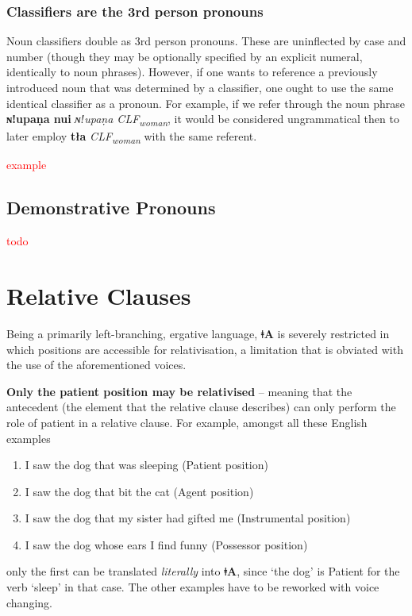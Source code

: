 \documentclass[11pt,a5paper]{book}
\newcommand{\qcn}[1]{\textcolor{AccentText}{\large\textbf{#1}}}
\newcommand{\langname}{\qcn{ǂA}}
\newcommand{\transl}[2]{\qcn{#1} \emph{#2}}
\newcommand{\grammsc}[1]{\textsc{#1}}
\newcommand{\CLF}[1]{\grammsc{CLF}\textsubscript{#1}}
\newcommand{\cmnt}[1]{\textcolor{red}{#1}}
\begin{document}
\subsubsection{Classifiers are the 3rd person pronouns}

Noun classifiers double as 3rd person pronouns. These are uninflected by case and number (though they may be optionally specified by an explicit numeral, identically to noun phrases). However, if one wants to reference a previously introduced noun that was determined by a classifier, one ought to use the same identical classifier as a pronoun. For example, if we refer through the noun phrase \transl{ɴǃupaṇa nui}{ɴǃupaṇa \CLF{woman}}, it would be considered ungrammatical then to later employ \transl{tła}{\CLF{woman}} with the same referent.

\cmnt{example}

\subsection{Demonstrative Pronouns}

\cmnt{todo}

\section{Relative Clauses}\label{sec:relative}

Being a primarily left-branching, ergative language, \langname{} is severely restricted in which positions are accessible for relativisation, a limitation that is obviated with the use of the aforementioned voices.

\textbf{Only the patient position may be relativised} -- meaning that the antecedent (the element that the relative clause describes) can only perform the role of patient in a relative clause. For example, amongst all these English examples

\begin{enumerate}
\item I saw the dog that was sleeping (Patient position)
\item I saw the dog that bit the cat (Agent position)
\item I saw the dog that my sister had gifted me (Instrumental position)
\item I saw the dog whose ears I find funny (Possessor position)
\end{enumerate}

only the first can be translated \emph{literally} into \langname{}, since `the dog' is Patient for the verb `sleep' in that case. The other examples have to be reworked with voice changing.
\end{document}
